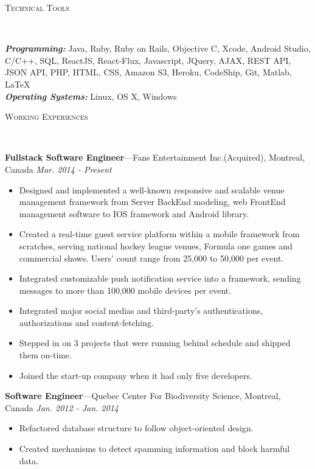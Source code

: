 \documentclass[11pt]{article}
\newenvironment{changemargin}[2]{%
  \begin{list}{}{%
    \setlength{\topsep}{0pt}%
    \setlength{\leftmargin}{#1}%
    \setlength{\rightmargin}{#2}%
    \setlength{\listparindent}{\parindent}%
    \setlength{\itemindent}{\parindent}%
    \setlength{\parsep}{\parskip}%
  }%
  \item[]}{\end{list}
}
\newcommand{\lineover}{
	\begin{changemargin}{-0.05in}{-0.05in}
		\vspace*{-8pt}
		\hrulefill \\
		\vspace*{-2pt}
	\end{changemargin}
}
\newcommand{\header}[1]{
	\begin{changemargin}{-0.5in}{-0.5in}
		\scshape{#1}\\
  	\lineover
	\end{changemargin}
}
\newenvironment{body} {
	\vspace*{-16pt}
	\begin{changemargin}{-0.25in}{-0.5in}
  }	
	{\end{changemargin}
}
\begin{document}
\header{Technical Tools}
\begin{body}
	\vspace{14pt}
	\emph{\textbf{Programming:}}{} Java, Ruby, Ruby on Rails, Objective C, Xcode, Android Studio, C/C++, SQL, ReactJS, React-Flux, Javascript, JQuery, AJAX, REST API, JSON API, PHP, HTML, CSS, Amazon S3, Heroku, CodeShip, Git, Matlab, \LaTeX\\
\medskip
	\emph{\textbf{Operating Systems:}}{} Linux, OS X, Windows\\
\end{body}
\smallskip
\header{Working Experiences}
\begin{body}
	\vspace{14pt}
	\textbf{Fullstack Software Engineer}---Fans Entertainment Inc.(Acquired), Montreal, Canada  \hfill \emph{Mar. 2014 - Present}\\
	\begin{itemize} \itemsep -0pt  %
		\item Designed and implemented a well-known responsive and scalable venue management framework from Server BackEnd modeling, web FrontEnd management software to IOS framework and Android library.
		\item Created a real-time guest service platform within a mobile framework from scratches, serving national hockey league venues, Formula one games and commercial shows. Users' count range from 25,000 to 50,000 per event.
		\item Integrated customizable push notification service into a framework, sending messages to more than 100,000 mobile devices per event.
		\item Integrated major social medias and third-party's authentications, authorizations and content-fetching.
		\item Stepped in on 3 projects that were running behind schedule and shipped them on-time.
		\item Joined the start-up company when it had only five developers.
	\end{itemize}

	\textbf{Software Engineer}---Quebec Center For Biodiversity Science, Montreal, Canada  \hfill \emph{Jan. 2012 - Jan. 2014}\\
	\begin{itemize} \itemsep -0pt  %
		\item Refactored database structure to follow object-oriented design.
		\item Created mechanisms to detect spamming information and block harmful data.
	\end{itemize}	
	

\end{body}
\end{document}
